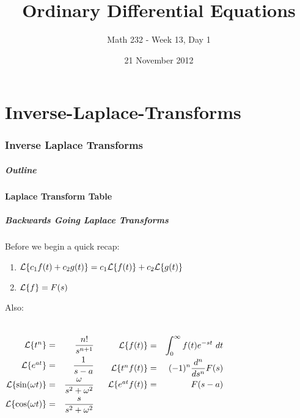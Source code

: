 \part{Inverse-Laplace-Transforms}
\section{Inverse Laplace Transforms}


\title{Ordinary Differential Equations}
\subtitle{Math 232 - Week 13, Day 1}
\date{21 November 2012}

\begin{frame}
  \titlepage
\end{frame}

\begin{frame}
  \frametitle{Outline}
\end{frame}


\subsection{Laplace Transform Table}

\begin{frame}
  \frametitle{Backwards Going Laplace Transforms }

  Before we begin a quick recap:
  \begin{enumerate}
  \item $\laplace{c_1 f(t) + c_2 g(t)}=c_1 \laplace{f(t)} + c_2 \laplace{g(t)}$
  \item $\laplace{f}=F(s)$
  \end{enumerate}

  Also:
  \begin{columns}
    \begin{eqnarray*}
      \laplace{t^n}    & = & \frac{n!}{s^{n+1}} \\ 
      \laplace{e^{at}} & = & \frac{1}{s-a} \\ 
      \laplace{\sin(\omega t)} & = & \frac{\omega}{s^2+\omega^2} \\
      \laplace{\cos(\omega t)} & = & \frac{s}{s^2+\omega^2} \\ 
    \end{eqnarray*}

    \begin{eqnarray*}
      \laplace{f(t)}  & = & \int^\infty_0 f(t) e^{-st} ~ dt \\ 
      \laplace{t^nf(t)} & = & (-1)^n\frac{d^n}{ds^n}F(s) \\
      \laplace{e^{at}f(t)} & = & F(s-a) 
    \end{eqnarray*}

  \end{columns}


\end{frame}

